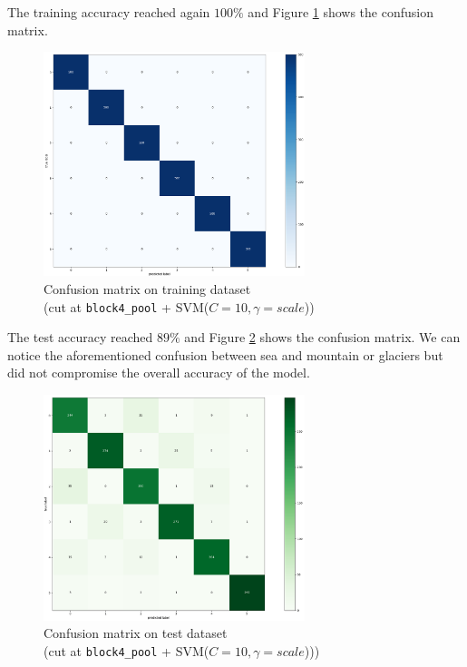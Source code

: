 \documentclass[compsoc]{IEEEtran}
\begin{document}
The training accuracy reached again $100\%$ and Figure \ref{fig:cm2-train} shows the confusion matrix. 


\begin{figure}[ht!]
\centering                                                                        
\includegraphics[width=3in]{../images/cm2-train.png}
\captionsetup{justification=centering}                                                                                         
\caption{Confusion matrix on training dataset \\ (cut at \texttt{block4\_pool} + SVM($C=10, \gamma=scale$))}
\label{fig:cm2-train}                                                                                                                               
\end{figure}

The test accuracy reached $89\%$ and Figure \ref{fig:cm2-test} shows the confusion matrix. We can notice the aforementioned confusion between sea and mountain or glaciers but did not compromise the overall accuracy of the model.


\begin{figure}[ht!]
\centering                                                                        
\includegraphics[width=3in]{../images/cm2-test.png}
\captionsetup{justification=centering}                                                                                         
\caption{Confusion matrix on test dataset \\ (cut at \texttt{block4\_pool} + SVM($C=10, \gamma=scale$)))}
\label{fig:cm2-test}                                                                                                                               
\end{figure}
\end{document}

